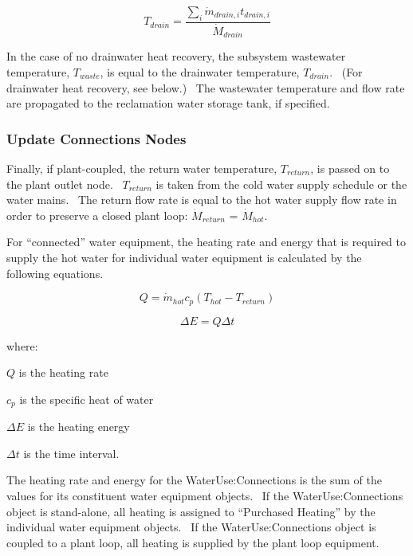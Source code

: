 \begin{equation}
{T_{drain}} = \frac{{\mathop \sum \limits_i {{\dot m}_{drain,i}}{t_{drain,i}}}}{{{{\dot M}_{drain}}}}
\end{equation}

In the case of no drainwater heat recovery, the subsystem wastewater temperature, \({T_{waste}}\), is equal to the drainwater temperature, \({T_{drain}}\).~ (For drainwater heat recovery, see below.)~ The wastewater temperature and flow rate are propagated to the reclamation water storage tank, if specified.

\subsubsection{Update Connections Nodes}\label{update-connections-nodes}

Finally, if plant-coupled, the return water temperature, \({T_{return}}\), is passed on to the plant outlet node.~ \({T_{return}}\) is taken from the cold water supply schedule or the water mains.~ The return flow rate is equal to the hot water supply flow rate in order to preserve a closed plant loop: \({\dot M_{return}}\) = \({\dot M_{hot}}\).

For ``connected'' water equipment, the heating rate and energy that is required to supply the hot water for individual water equipment is calculated by the following equations.

\begin{equation}
Q = {\dot m_{hot}}{c_p}\left( {{T_{hot}} - {T_{return}}} \right)
\end{equation}

\begin{equation}
\Delta E = Q\Delta t
\end{equation}

where:

\(Q\) is the heating rate

\({c_p}\) is the specific heat of water

\(\Delta E\) is the heating energy

\(\Delta t\) is the time interval.

The heating rate and energy for the WaterUse:Connections is the sum of the values for its constituent water equipment objects.~ If the WaterUse:Connections object is stand-alone, all heating is assigned to ``Purchased Heating'' by the individual water equipment objects.~ If the WaterUse:Connections object is coupled to a plant loop, all heating is supplied by the plant loop equipment.

